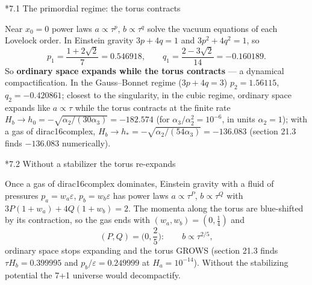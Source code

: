 \documentclass[10pt,a4paper]{article}
\makeatletter
\renewcommand\subsection{\@startsection{subsection}{2}{\z@}{-3.25ex\@plus -1ex \@minus -.2ex}{1.5ex \@plus .2ex}{\normalfont\large\bfseries\raggedright}}
\makeatother
\begin{document}
\subsection*{7.1 The primordial regime: the torus contracts}
Near $x_0=0$ power laws $a\propto\tau^p$, $b\propto\tau^q$ solve the vacuum equations of each Lovelock order. In Einstein gravity $3p+4q=1$ and $3p^2+4q^2=1$, so
\begin{equation*}
p_1=\frac{1+2\sqrt2}7=0.546918,\qquad q_1=\frac{2-3\sqrt2}{14}=-0.160189 .
\end{equation*}
So \textbf{ordinary space expands while the torus contracts} — a dynamical compactification. In the Gauss–Bonnet regime ($3p+4q=3$) $p_2=1.56115$, $q_2=-0.420861$; closest to the singularity, in the cubic regime, ordinary space expands like $a\propto\tau$ while the torus contracts at the finite rate $H_b\to h_0=-\sqrt{\alpha_2/(30\alpha_3)}=-182.574$ (for $\alpha_3/\alpha_2^2=10^{-6}$, in units $\alpha_2=1$); with a gas of dirac16complex, $H_b\to h_*=-\sqrt{\alpha_2/(54\alpha_3)}=-136.083$ (section 21.3 finds $-136.083$ numerically).

\subsection*{7.2 Without a stabilizer the torus re-expands}
Once a gas of dirac16complex dominates, Einstein gravity with a fluid of pressures $p_a=w_a\varepsilon$, $p_b=w_b\varepsilon$ has power laws $a\propto\tau^P$, $b\propto\tau^Q$ with $3P(1+w_a)+4Q(1+w_b)=2$. The momenta along the torus are blue-shifted by its contraction, so the gas ends with $(w_a,w_b)=(0,\frac14)$ and
\begin{equation*}
(P,Q)=\Big(0,\frac25\Big):\qquad b\propto\tau^{2/5},
\end{equation*}
ordinary space stops expanding and the torus GROWS (section 21.3 finds $\tau H_b=0.399995$ and $p_b/\varepsilon=0.249999$ at $H_a=10^{-14}$). Without the stabilizing potential the 7+1 universe would decompactify.
\end{document}
